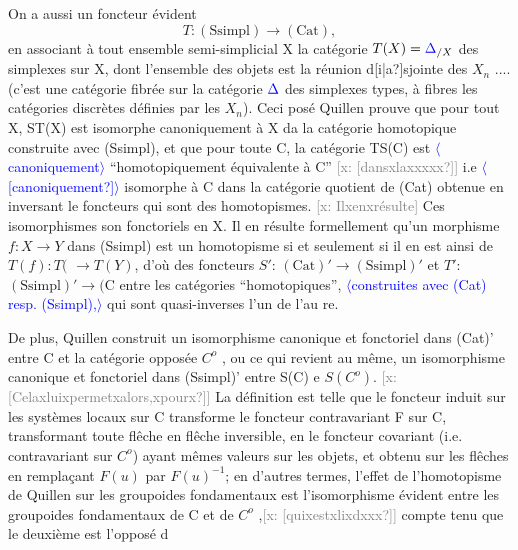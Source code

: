 \documentclass[11pt]{article}
\newcommand{\hand}[1]{\textcolor{blue}{#1}}
\newcommand{\inserted}[2][]{\textcolor{blue}{$\langle$#2$\rangle$}}
\newcommand{\xout}[1]{\textcolor{gray}{[\textsf{x:} #1]}}
\newcommand{\unsure}[1]{[#1?]}
\begin{document}
On a aussi un foncteur évident
\[ T: (\mathrm{Ssimpl}) \longrightarrow (\mathrm{Cat}) , \]
en associant à tout ensemble semi-simplicial X la catégorie $T(X) = \hand{\Delta}_{/X}$
des simplexes sur X, dont l'ensemble des objets est la réunion d\unsure{i|a}sjointe
des $X_n$ .... (c'est une catégorie fibrée sur la catégorie $\hand{\Delta}$ des simplexes
types, à fibres les catégories discrètes définies par les $X_n$). Ceci posé
Quillen prouve que pour tout X, ST(X) est isomorphe canoniquement à X da
la catégorie homotopique construite avec (Ssimpl), et que pour toute C,
la catégorie TS(C) est \inserted[typed]{canoniquement} ``homotopiquement équivalente à C'' \xout{\unsure{dansxlaxxxxx}} i.e
\inserted[typed]{\unsure{canoniquement}} isomorphe à C dans la catégorie quotient de (Cat) obtenue en inversant le
foncteurs qui sont des homotopismes. \xout{Ilxenxrésulte} Ces isomorphismes son
fonctoriels en X. Il en résulte formellement qu'un morphisme $f:X\rightarrow Y$ dans
(Ssimpl) est un homotopisme si et seulement si il en est ainsi de $T(f):T($
$\rightarrow T(Y)$, d'où des foncteurs $S'$: $(\mathrm{Cat})' \longrightarrow (\mathrm{Ssimpl})'$ et $T'$:$(\mathrm{Ssimpl})' \longrightarrow (\mathrm{C}$
entre les catégories ``homotopiques'', \inserted[typed]{construites avec (Cat) resp. (Ssimpl),} qui sont quasi-inverses l'un de l'au
re.

De plus, Quillen construit un isomorphisme canonique et fonctoriel
dans (Cat)' entre C et la catégorie opposée $C^{o}$ , ou ce qui revient au
même, un isomorphisme canonique et fonctoriel dans (Ssimpl)' entre S(C) e
$S(C^{o})$. \xout{\unsure{Celaxluixpermetxalors,xpourx}} La définition est telle que le
foncteur induit sur les systèmes locaux sur C transforme le foncteur
contravariant F sur C, transformant toute flêche en flêche inversible, en
le foncteur covariant (i.e. contravariant sur $C^{o}$) ayant mêmes valeurs sur
les objets, et obtenu sur les flêches en remplaçant $F(u)$ par $F(u)^{-1}$; en
d'autres termes, l'effet de l'homotopisme de Quillen sur les groupoides
fondamentaux est l'isomorphisme évident entre les groupoides fondamentaux
de C et de $C^{o}$ ,\xout{\unsure{quixestxlixdxxx}} compte tenu que le deuxième est l'opposé d
\end{document}
